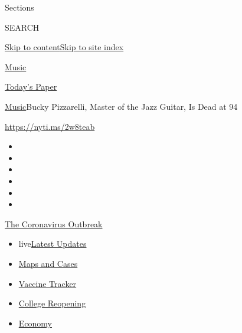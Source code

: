 Sections

SEARCH

\protect\hyperlink{site-content}{Skip to
content}\protect\hyperlink{site-index}{Skip to site index}

\href{https://www.nytimes3xbfgragh.onion/section/arts/music}{Music}

\href{https://myaccount.nytimes3xbfgragh.onion/auth/login?response_type=cookie\&client_id=vi}{}

\href{https://www.nytimes3xbfgragh.onion/section/todayspaper}{Today's
Paper}

\href{/section/arts/music}{Music}\textbar{}Bucky Pizzarelli, Master of
the Jazz Guitar, Is Dead at 94

\url{https://nyti.ms/2w8teab}

\begin{itemize}
\item
\item
\item
\item
\item
\item
\end{itemize}

\href{https://www.nytimes3xbfgragh.onion/news-event/coronavirus?action=click\&pgtype=Article\&state=default\&region=TOP_BANNER\&context=storylines_menu}{The
Coronavirus Outbreak}

\begin{itemize}
\tightlist
\item
  live\href{https://www.nytimes3xbfgragh.onion/2020/08/04/world/coronavirus-covid-19.html?action=click\&pgtype=Article\&state=default\&region=TOP_BANNER\&context=storylines_menu}{Latest
  Updates}
\item
  \href{https://www.nytimes3xbfgragh.onion/interactive/2020/us/coronavirus-us-cases.html?action=click\&pgtype=Article\&state=default\&region=TOP_BANNER\&context=storylines_menu}{Maps
  and Cases}
\item
  \href{https://www.nytimes3xbfgragh.onion/interactive/2020/science/coronavirus-vaccine-tracker.html?action=click\&pgtype=Article\&state=default\&region=TOP_BANNER\&context=storylines_menu}{Vaccine
  Tracker}
\item
  \href{https://www.nytimes3xbfgragh.onion/2020/08/02/us/covid-college-reopening.html?action=click\&pgtype=Article\&state=default\&region=TOP_BANNER\&context=storylines_menu}{College
  Reopening}
\item
  \href{https://www.nytimes3xbfgragh.onion/live/2020/08/03/business/stock-market-today-coronavirus?action=click\&pgtype=Article\&state=default\&region=TOP_BANNER\&context=storylines_menu}{Economy}
\end{itemize}

